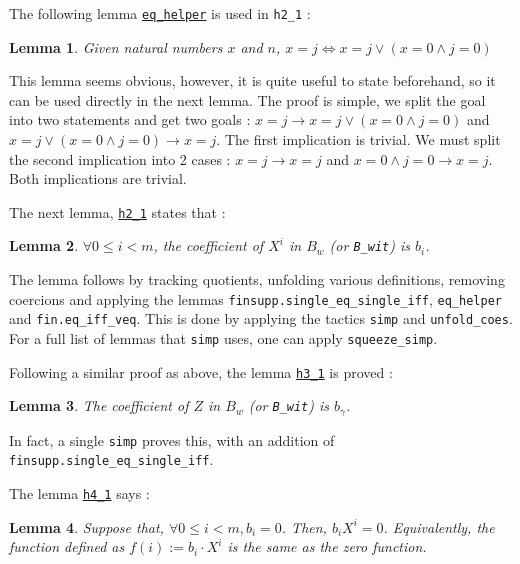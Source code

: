 \documentclass{article}
\newtheorem{lemma}{Lemma}
\theoremstyle{definition}
\theoremstyle{remark}
\begin{document}
The following lemma \href{https://github.com/BoltonBailey/formal-snarks-project/blob/7fd9cd122f5887f88f6a706b4f2a68a7153c7381/src/snarks/babysnark/knowledge_soundness.lean#L211}{\texttt{eq\_helper}} 
is used in \texttt{h2\_1} :
\theoremstyle{lemma}
\begin{lemma} 
    Given natural numbers $x$ and $n$, $x = j \iff x = j \vee (x = 0 \wedge j = 0) $
\end{lemma}

This lemma seems obvious, however, it is quite useful to state beforehand, so it can be used directly in the next lemma.
The proof is simple, we split the goal into two statements and get two goals : $x = j \to x = j \vee (x = 0 \wedge j = 0)$ and 
$x = j \vee (x = 0 \wedge j = 0) \to x = j$. The first implication is trivial. We must split the second implication into 2 cases :
$x = j \to x = j$ and $x = 0 \wedge j = 0 \to x = j$. Both implications are trivial. 

The next lemma, \href{https://github.com/BoltonBailey/formal-snarks-project/blob/7fd9cd122f5887f88f6a706b4f2a68a7153c7381/src/snarks/babysnark/knowledge_soundness.lean#L223}{\texttt{h2\_1}} states that :
\theoremstyle{lemma} \label{h2_1}
\begin{lemma}
    $\forall 0 \le i < m$, the coefficient of $X^{i}$ in $B_{w}$ (or \texttt{B\_wit}) is $b_i$.
\end{lemma}

The lemma follows by tracking quotients, unfolding various definitions, removing coercions and applying the lemmas \texttt{finsupp.single\_eq\_single\_iff}, \texttt{eq\_helper} and \texttt{fin.eq\_iff\_veq}. This is done by applying the tactics 
\texttt{simp} and \texttt{unfold\_coes}. For a full list of lemmas that \texttt{simp} uses, one can apply \texttt{squeeze\_simp}.

Following a similar proof as above, the lemma \href{https://github.com/BoltonBailey/formal-snarks-project/blob/7fd9cd122f5887f88f6a706b4f2a68a7153c7381/src/snarks/babysnark/knowledge_soundness.lean#L244}{\texttt{h3\_1}} is proved : 
\theoremstyle{lemma} \label{h3_1}
\begin{lemma}
    The coefficient of $Z$ in $B_{w}$ (or \texttt{B\_wit}) is $b_{\gamma}$.
\end{lemma}

In fact, a single \texttt{simp} proves this, with an addition of \texttt{finsupp.single\_eq\_single\_iff}.

The lemma \href{https://github.com/BoltonBailey/formal-snarks-project/blob/7fd9cd122f5887f88f6a706b4f2a68a7153c7381/src/snarks/babysnark/knowledge_soundness.lean#L261}{\texttt{h4\_1}} says :
\theoremstyle{lemma}
\begin{lemma} \label{h4_1}
    Suppose that, $\forall 0 \le i < m, b_{i} = 0$. Then, $b_i X^i = 0$. Equivalently, the function defined as $f(i) := b_i \cdot X^i$ is the same as the zero function.
\end{lemma}
\end{document}
